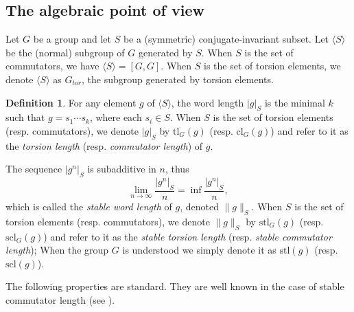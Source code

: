\documentclass{amsart}
\theoremstyle{definition}
\newtheorem{definition}[theorem]{Definition}
\numberwithin{equation}{section}
\theoremstyle{theorem}
\theoremstyle{remark}
\def\cl{\mathrm{cl}}
\def\scl{\mathrm{scl}}
\def\tl{\mathrm{tl}}
\def\stl{\mathrm{stl}}
\def\Gt{G_{tor}}
\begin{document}
	
	\subsection{The algebraic point of view}\label{subsec: algebraic}
	Let $G$ be a group and let $S$ be a (symmetric) conjugate-invariant subset. Let $\langle S\rangle$ be the (normal) subgroup of $G$ generated by $S$.
	When $S$ is the set of commutators, we have $\langle S\rangle=[G,G]$. When $S$ is the set of torsion elements, we denote $\langle S\rangle$ as $\Gt$, the subgroup generated by torsion elements.
	\begin{definition}
		For any element $g$ of $\langle S\rangle$, the word length $|g|_S$ is
		the minimal $k$ such that $g=s_1\cdots s_k$, where each $s_i\in S$.
		When $S$ is the set of torsion elements (resp. commutators), 
		we denote $|g|_S$ by $\tl_G(g)$ (resp. $\cl_G(g)$) and refer to it as the \emph{torsion length} (resp. \emph{commutator length}) of $g$.
	\end{definition}
	The sequence $|g^n|_S$ is subadditive in $n$, thus
	$$\lim_{n\to\infty} \frac{|g^n|_S}{n}=\inf \frac{|g^n|_S}{n},$$
	which is called the \emph{stable word length} of $g$, denoted $\|g\|_S$.
	When $S$ is the set of torsion elements (resp. commutators), we denote $\|g\|_S$ by $\stl_G(g)$ (resp. $\scl_G(g)$) and refer to it as
	the \emph{stable torsion length} (resp. \emph{stable commutator length});
	When the group $G$ is understood we simply denote it as $\stl(g)$ (resp. $\scl(g)$).
	
	The following properties are standard. They are well known in the case of stable commutator length (see \cite[Chapter 2]{Cal:sclbook}).
	
\end{document}
